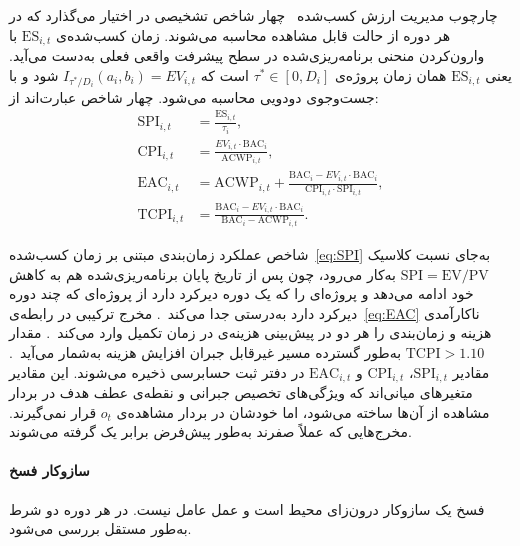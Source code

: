 چارچوب مدیریت ارزش کسب‌شده~\citep{Fleming2010} چهار شاخص تشخیصی در
اختیار می‌گذارد که در هر دوره از حالت قابل مشاهده محاسبه می‌شوند.
زمان کسب‌شده‌ی $\mathrm{ES}_{i,t}$ با وارون‌کردن منحنی 
برنامه‌ریزی‌شده در سطح پیشرفت واقعی فعلی به‌دست می‌آید. یعنی
$\mathrm{ES}_{i,t}$ همان زمان پروژه‌ی $\tau^* \in [0, D_i]$ است که
$I_{\tau^*/D_i}(a_i, b_i) = EV_{i,t}$ شود و با جست‌وجوی دودویی محاسبه
می‌شود. چهار شاخص عبارت‌اند از:
\begin{align}
  \mathrm{SPI}_{i,t}
    &= \frac{\mathrm{ES}_{i,t}}{\tau_i},
  \label{eq:SPI} \\
  \mathrm{CPI}_{i,t}
    &= \frac{EV_{i,t} \cdot \mathrm{BAC}_i}{\mathrm{ACWP}_{i,t}},
  \label{eq:CPI} \\
  \mathrm{EAC}_{i,t}
    &= \mathrm{ACWP}_{i,t}
       + \frac{\mathrm{BAC}_i - EV_{i,t} \cdot \mathrm{BAC}_i}
              {\mathrm{CPI}_{i,t} \cdot \mathrm{SPI}_{i,t}},
  \label{eq:EAC} \\
  \mathrm{TCPI}_{i,t}
    &= \frac{\mathrm{BAC}_i - EV_{i,t} \cdot \mathrm{BAC}_i}
            {\mathrm{BAC}_i - \mathrm{ACWP}_{i,t}}.
  \label{eq:TCPI}
\end{align}

شاخص عملکرد زمان‌بندی مبتنی بر زمان کسب‌شده~\eqref{eq:SPI} به‌جای نسبت
کلاسیک $\mathrm{SPI} = \mathrm{EV}/\mathrm{PV}$ به‌کار می‌رود، چون پس
از تاریخ پایان برنامه‌ریزی‌شده هم به کاهش خود ادامه می‌دهد و پروژه‌ای
را که یک دوره دیرکرد دارد از پروژه‌ای که چند دوره دیرکرد دارد به‌درستی
جدا می‌کند~\citep{Lipke2003}. مخرج ترکیبی در رابطه‌ی~\eqref{eq:EAC}
ناکارآمدی هزینه و زمان‌بندی را هر دو در پیش‌بینی هزینه‌ی در زمان تکمیل
وارد می‌کند~\citep{christensen1993est}. مقدار $\mathrm{TCPI} > 1.10$
به‌طور گسترده مسیر غیرقابل جبران افزایش هزینه به‌شمار می‌آید~\citep{Fleming2010}.
مقادیر $\mathrm{SPI}_{i,t}$، $\mathrm{CPI}_{i,t}$ و
$\mathrm{EAC}_{i,t}$ در دفتر ثبت حسابرسی ذخیره می‌شوند. این مقادیر
متغیرهای میانی‌اند که ویژگی‌های تخصیص جبرانی و نقطه‌ی عطف هدف در بردار
مشاهده از آن‌ها ساخته می‌شود، اما خودشان در بردار مشاهده‌ی $o_t$ قرار
نمی‌گیرند. مخرج‌هایی که عملاً صفرند به‌طور پیش‌فرض برابر یک گرفته
می‌شوند.

\paragraph{سازوکار فسخ}
\label{subsubsec:termination}

فسخ یک سازوکار درون‌زای محیط است و عمل عامل نیست. در هر دوره دو شرط
به‌طور مستقل بررسی می‌شود.

